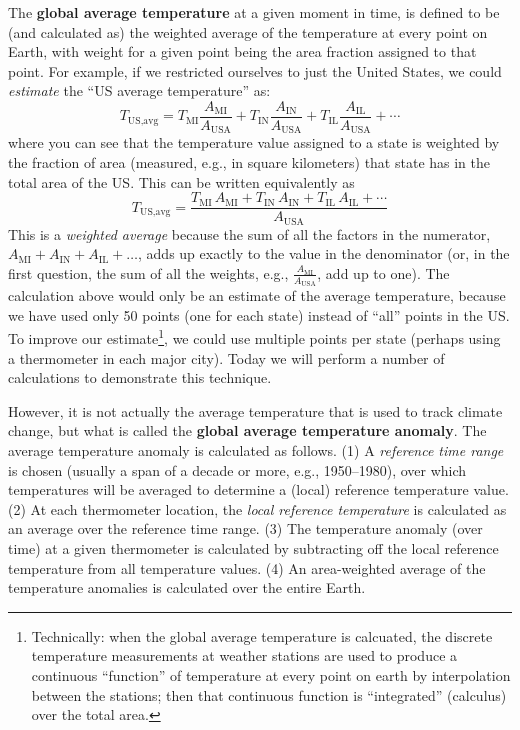  The {\bf global average temperature} at a given moment in time, is defined to be (and calculated as) the weighted average of the temperature at every point on Earth, with weight for a given point being the area fraction assigned to that point.  For example, if we restricted ourselves to just the United States, we could {\em estimate} the ``US average temperature'' as:
	\begin{equation*}
	T_\text{US,avg} = T_\text{MI} \frac{A_\text{MI}}{A_\text{USA}} + T_\text{IN} \frac{A_\text{IN}}{A_\text{USA}} + T_\text{IL} \frac{A_\text{IL}}{A_\text{USA}} + \cdots
	\end{equation*}
where you can see that the temperature value assigned to a state is weighted by the fraction of area (measured, e.g., in square kilometers) that state has in the total area of the US.  This can be written equivalently as
	\begin{equation*}
	T_\text{US,avg} = \frac{T_\text{MI} \, A_\text{MI} +  T_\text{IN} \,  A_\text{IN} +  T_\text{IL} \,  A_\text{IL} + \cdots}{A_\text{USA} }
	\end{equation*}
This is a {\em weighted average} because the sum of all the factors in the numerator, $A_\text{MI} + A_\text{IN} + A_\text{IL} + \ldots$, adds up exactly to the value in the denominator (or, in the first question, the sum of all the weights, e.g., $\frac{A_\text{MI}}{A_\text{USA}}$, add up to one).  The calculation above would only be an estimate of the average temperature, because we have used only 50 points (one for each state) instead of ``all'' points in the US.  To improve our estimate\footnote{Technically: when the global average temperature is calcuated, the discrete temperature measurements at weather stations are used to produce a continuous ``function'' of temperature at every point on earth by interpolation between the stations; then that continuous function is ``integrated'' (calculus) over the total area.}, we could use multiple points per state (perhaps using a thermometer in each major city). Today we will perform a number of calculations to demonstrate this technique.

However, it is not actually the average temperature that is used to track climate change, but what is called the {\bf global average temperature anomaly}.  The average temperature anomaly is calculated as follows.  (1) A {\em reference time range} is chosen (usually a span of a decade or more, e.g., 1950--1980), over which temperatures will be averaged to determine a (local) reference temperature value. (2) At each thermometer location, the {\em local reference temperature} is calculated as an average over the reference time range. (3) The temperature anomaly (over time) at a given thermometer is calculated by subtracting off the local reference temperature from all temperature values.  (4) An area-weighted average of the temperature anomalies is calculated over the entire Earth. 


